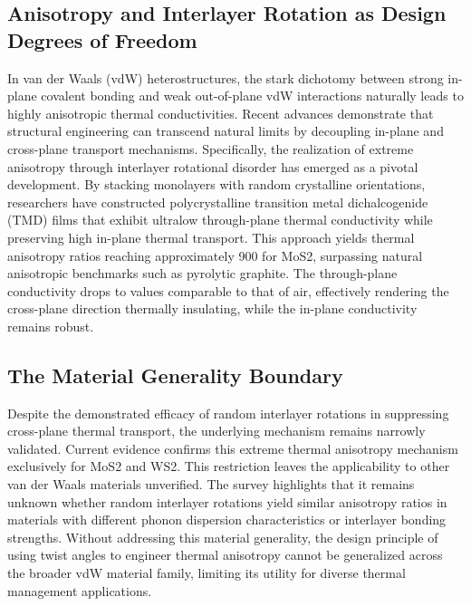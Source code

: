 \documentclass[conference]{IEEEtran}
\begin{document}
\subsection{Anisotropy and Interlayer Rotation as Design Degrees of Freedom}
In van der Waals (vdW) heterostructures, the stark dichotomy between strong in-plane covalent bonding and weak out-of-plane vdW interactions naturally leads to highly anisotropic thermal conductivities. Recent advances demonstrate that structural engineering can transcend natural limits by decoupling in-plane and cross-plane transport mechanisms. Specifically, the realization of extreme anisotropy through interlayer rotational disorder has emerged as a pivotal development. By stacking monolayers with random crystalline orientations, researchers have constructed polycrystalline transition metal dichalcogenide (TMD) films that exhibit ultralow through-plane thermal conductivity while preserving high in-plane thermal transport. This approach yields thermal anisotropy ratios reaching approximately 900 for MoS2, surpassing natural anisotropic benchmarks such as pyrolytic graphite. The through-plane conductivity drops to values comparable to that of air, effectively rendering the cross-plane direction thermally insulating, while the in-plane conductivity remains robust.~\cite{cite_26ecaf73d88dfe33}

\subsection{The Material Generality Boundary}
Despite the demonstrated efficacy of random interlayer rotations in suppressing cross-plane thermal transport, the underlying mechanism remains narrowly validated. Current evidence confirms this extreme thermal anisotropy mechanism exclusively for MoS2 and WS2. This restriction leaves the applicability to other van der Waals materials unverified. The survey highlights that it remains unknown whether random interlayer rotations yield similar anisotropy ratios in materials with different phonon dispersion characteristics or interlayer bonding strengths. Without addressing this material generality, the design principle of using twist angles to engineer thermal anisotropy cannot be generalized across the broader vdW material family, limiting its utility for diverse thermal management applications.~\cite{cite_26ecaf73d88dfe33}
\end{document}
